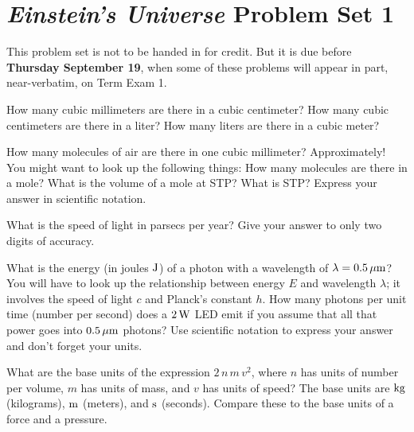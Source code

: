 \documentclass[12pt, letterpaper]{article}
\begin{document}
\section*{\textsl{Einstein's Universe} Problem Set 1}

This problem set is not to be handed in for credit. But it is due
before \textbf{Thursday September 19}, when some of these problems
will appear in part, near-verbatim, on Term Exam 1.

\begin{problem}
How many cubic millimeters are there in a cubic centimeter? How many
cubic centimeters are there in a liter? How many liters are there in a
cubic meter?
\end{problem}

\begin{problem}
How many molecules of air are there in one cubic millimeter?
Approximately! You might want to look up the following things: How
many molecules are there in a mole? What is the volume of a mole at
STP? What is STP? Express your answer in scientific notation.
\end{problem}

\begin{problem}
What is the speed of light in parsecs per year? Give your answer to
only two digits of accuracy.
\end{problem}

\begin{problem}
What is the energy (in joules $\mathrm{J}$) of a photon with a wavelength of
$\lambda = 0.5\,\mathrm{\mu m}$? You will have to look up the relationship
between energy $E$ and wavelength $\lambda$; it involves the speed of
light $c$ and Planck's constant $h$. How many photons per unit time
(number per second) does a $2\,\mathrm{W}$ LED emit if you assume that all
that power goes into $0.5\,\mathrm{\mu m}$ photons? Use scientific notation to
express your answer and don't forget your units.
\end{problem}

\begin{problem}
What are the base units of the expression $2\,n\,m\,v^2$, where $n$
has units of number per volume, $m$ has units of mass, and $v$ has
units of speed? The base units are $\mathrm{kg}$ (kilograms), $\mathrm{m}$ (meters),
and $\mathrm{s}$ (seconds). Compare these to the base units of a force and a
pressure.
\end{problem}
\end{document}
